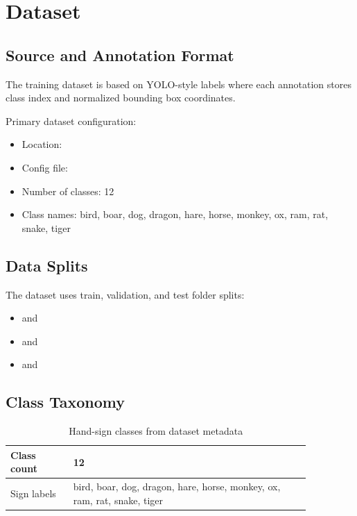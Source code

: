 \chapter{Dataset}

\section{Source and Annotation Format}
The training dataset is based on YOLO-style labels where each annotation stores class index and normalized bounding box coordinates.

Primary dataset configuration:
\begin{itemize}[leftmargin=2em]
\item Location: \texttt{}
\item Config file: \texttt{}
\item Number of classes: 12
\item Class names: bird, boar, dog, dragon, hare, horse, monkey, ox, ram, rat, snake, tiger
\end{itemize}

\section{Data Splits}
The dataset uses train, validation, and test folder splits:
\begin{itemize}[leftmargin=2em]
\item \texttt{} and \texttt{}
\item \texttt{} and \texttt{}
\item \texttt{} and \texttt{}
\end{itemize}

\section{Class Taxonomy}
\begin{table}[H]
\centering
\caption{Hand-sign classes from dataset metadata}
\label{tab:dataset_classes}
\begin{tabular}{p{0.18\linewidth}p{0.68\linewidth}}
\toprule
Class count & 12 \\
\midrule
Sign labels & bird, boar, dog, dragon, hare, horse, monkey, ox, ram, rat, snake, tiger \\
\bottomrule
\end{tabular}
\end{table}

